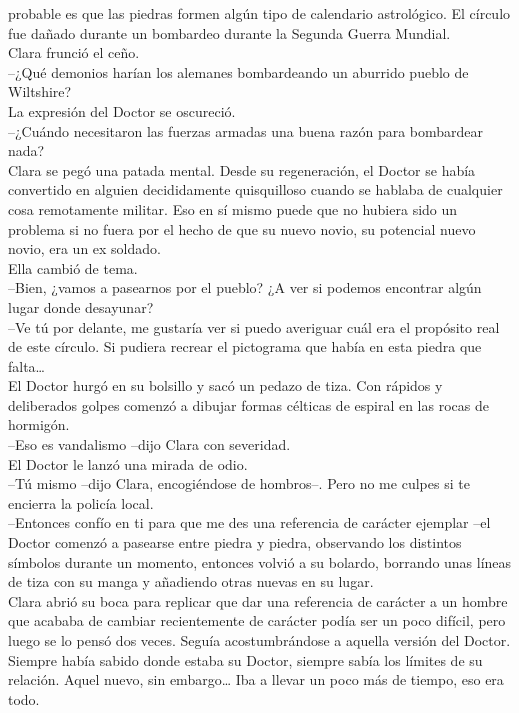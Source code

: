 {probable es que las piedras formen algún tipo de calendario astrológico.
El círculo fue dañado durante un bombardeo durante la Segunda Guerra
Mundial.\\
Clara frunció el ceño.\\
--¿Qué demonios harían los alemanes bombardeando un aburrido pueblo de
Wiltshire?\\
La expresión del Doctor se oscureció.\\
--¿Cuándo necesitaron las fuerzas armadas una buena razón para
bombardear nada?\\
Clara se pegó una patada mental. Desde su regeneración, el Doctor se
había convertido en alguien decididamente quisquilloso cuando se hablaba
de cualquier cosa remotamente militar. Eso en sí mismo puede que no
hubiera sido un problema si no fuera por el hecho de que su nuevo novio,
su potencial nuevo novio, era un ex soldado.\\
Ella cambió de tema.\\
--Bien, ¿vamos a pasearnos por el pueblo? ¿A ver si podemos encontrar
algún lugar donde desayunar?\\
--Ve tú por delante, me gustaría ver si puedo averiguar cuál era el
propósito real de este círculo. Si pudiera recrear el pictograma que
había en esta piedra que falta\ldots{}\\
El Doctor hurgó en su bolsillo y sacó un pedazo de tiza. Con rápidos y
deliberados golpes comenzó a dibujar formas célticas de espiral en las
rocas de hormigón.\\
--Eso es vandalismo --dijo Clara con severidad.\\
El Doctor le lanzó una mirada de odio.\\
--Tú mismo --dijo Clara, encogiéndose de hombros--. Pero no me culpes si
te encierra la policía local.\\
--Entonces confío en ti para que me des una referencia de carácter
ejemplar --el Doctor comenzó a pasearse entre piedra y piedra,
observando los distintos símbolos durante un momento, entonces volvió a
su bolardo, borrando unas líneas de tiza con su manga y añadiendo otras
nuevas en su lugar.\\
Clara abrió su boca para replicar que dar una referencia de carácter a
un hombre que acababa de cambiar recientemente de carácter podía ser un
poco difícil, pero luego se lo pensó dos veces. Seguía acostumbrándose a
aquella versión del Doctor. Siempre había sabido donde estaba su Doctor,
siempre sabía los límites de su relación. Aquel nuevo, sin
embargo\ldots{} Iba a llevar un poco más de tiempo, eso era todo.\\
}
